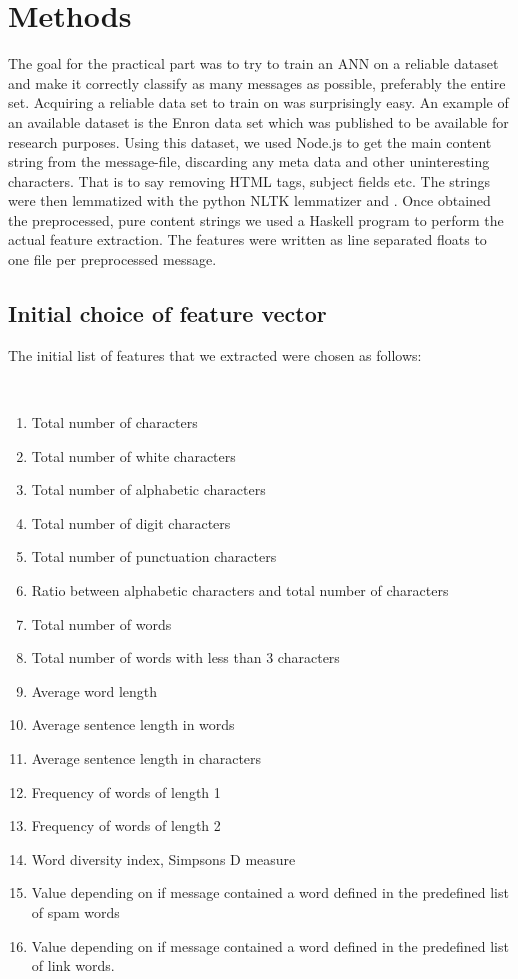 
\section{Methods}
  
  The goal for the practical part was to try to train an ANN on a reliable
  dataset and make it correctly classify as many messages as possible,
  preferably the entire set.
  Acquiring a reliable data set to train on was surprisingly easy. An
  example of an available dataset is the Enron data set \cite{enron} which was
  published to be available for research purposes. Using this dataset, 
  we used Node.js to get the main content string from the
  message-file, discarding any meta data and other uninteresting characters.
  That is to say removing HTML tags, subject fields etc. The strings were then
  lemmatized with the python NLTK lemmatizer \cite{nltk} and \cite{bird2009natural}. Once obtained the
  preprocessed, pure content strings we used a Haskell program to perform the
  actual feature extraction. The features were written as line separated floats
  to one file per preprocessed message.
  \subsection{Initial choice of feature vector}
    The initial list of features that we extracted were chosen as follows:
    \begin{poem}\mbox{}\\[-\baselineskip]
      \begin{enumerate}
        \item Total number of characters
        \item Total number of white characters 
        \item Total number of alphabetic characters
        \item Total number of digit characters
        \item Total number of punctuation characters
        \item Ratio between alphabetic characters and total number of characters
        \item Total number of words
        \item Total number of words with less than 3 characters
        \item Average word length 
        \item Average sentence length in words
        \item Average sentence length in characters
        \item Frequency of words of length 1
        \item Frequency of words of length 2
        \item Word diversity index, Simpsons D measure \cite{simpsons-measure}
        \item Value depending on if message contained a word defined in the
          predefined list of spam words
        \item Value depending on if message contained a word defined in the 
          predefined list of link words.
      \end{enumerate}
    \end{poem} 

